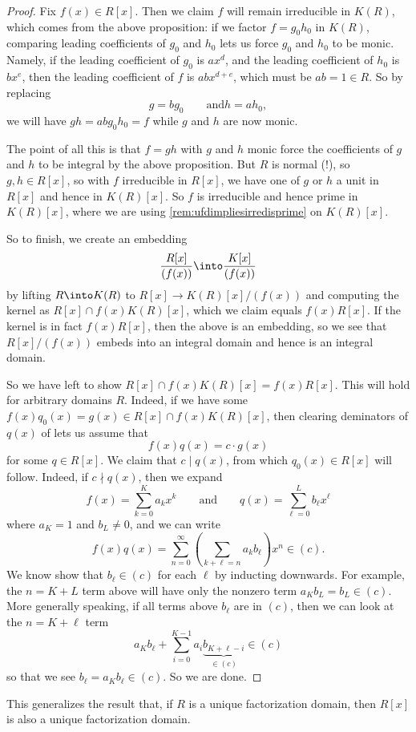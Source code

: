 \begin{proof}
	Fix $f(x)\in R[x]$. Then we claim $f$ will remain irreducible in $K(R)$, which comes from the above proposition: if we factor $f=g_0h_0$ in $K(R)$, comparing leading coefficients of $g_0$ and $h_0$ lets us force $g_0$ and $h_0$ to be monic. Namely, if the leading coefficient of $g_0$ is $ax^d$, and the leading coefficient of $h_0$ is $bx^e$, then the leading coefficient of $f$ is $abx^{d+e}$, which must be $ab=1\in R$. So by replacing
	\[g=bg_0\qquad\text{and}h=ah_0,\]
	we will have $gh=abg_0h_0=f$ while $g$ and $h$ are now monic.

	The point of all this is that $f=gh$ with $g$ and $h$ monic force the coefficients of $g$ and $h$ to be integral by the above proposition. But $R$ is normal (!), so $g,h\in R[x]$, so with $f$ irreducible in $R[x]$, we have one of $g$ or $h$ a unit in $R[x]$ and hence in $K(R)[x]$. So $f$ is irreducible and hence prime in $K(R)[x]$, where we are using \autoref{rem:ufdimpliesirredisprime} on $K(R)[x]$.

	So to finish, we create an embedding
	\[\frac{R[x]}{(f(x))}\into\frac{K[x]}{(f(x))}\]
	by lifting $R\into K(R)$ to $R[x]\to K(R)[x]/(f(x))$ and computing the kernel as $R[x]\cap f(x)K(R)[x]$, which we claim equals $f(x)R[x]$. If the kernel is in fact $f(x)R[x]$, then the above is an embedding, so we see that $R[x]/(f(x))$ embeds into an integral domain and hence is an integral domain.
	
	So we have left to show $R[x]\cap f(x)K(R)[x]=f(x)R[x]$. This will hold for arbitrary domains $R$. Indeed, if we have some $f(x)q_0(x)=g(x)\in R[x]\cap f(x)K(R)[x]$, then clearing deminators of $q(x)$ of lets us assume that
	\[f(x)q(x)=c\cdot g(x)\]
	for some $q\in R[x]$. We claim that $c\mid q(x)$, from which $q_0(x)\in R[x]$ will follow. Indeed, if $c\nmid q(x)$, then we expand
	\[f(x)=\sum_{k=0}^Ka_kx^k\qquad\text{and}\qquad q(x)=\sum_{\ell=0}^Lb_\ell x^\ell\]
	where $a_K=1$ and $b_L\ne0$, and we can write
	\[f(x)q(x)=\sum_{n=0}^\infty\left(\sum_{k+\ell=n}a_kb_\ell\right)x^n\in(c).\]
	We know show that $b_\ell\in(c)$ for each $\ell$ by inducting downwards. For example, the $n=K+L$ term above will have only the nonzero term $a_Kb_L=b_L\in(c)$. More generally speaking, if all terms above $b_\ell$ are in $(c)$, then we can look at the $n=K+\ell$ term
	\[a_Kb_\ell+\sum_{i=0}^{K-1}a_i\underbrace{b_{K+\ell-i}}_{\in(c)}\in(c)\]
	so that we see $b_\ell=a_Kb_\ell\in(c)$. So we are done.
\end{proof}
\begin{remark}
	This generalizes the result that, if $R$ is a unique factorization domain, then $R[x]$ is also a unique factorization domain.
\end{remark}

